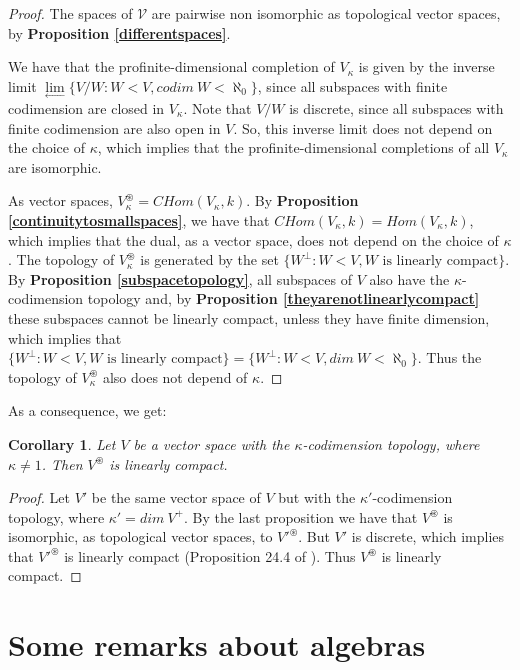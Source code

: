 \documentclass[a4paper,12pt]{article}
\newtheorem{cor}[prop]{Corollary}
\theoremstyle{bloco}
\begin{document}
\begin{proof}The spaces of $\mathcal{V}$ are pairwise non isomorphic as topological vector spaces, by \textbf{Proposition \ref{differentspaces}}. 

We have that the profinite-dimensional completion of $V_{\kappa}$ is given by the inverse limit $\lim\limits_{\longleftarrow}\{V/W: W < V, codim \ W < \aleph_{0} \}$, since all subspaces with finite codimension are closed in $V_{\kappa}$. Note that $V/W$ is discrete, since all subspaces with finite codimension are also open in $V$. So, this inverse limit does not depend on the choice of $\kappa$, which implies that the profinite-dimensional completions of all $V_{\kappa}$ are isomorphic. 

As vector spaces, $V_{\kappa}^{\circledast} = CHom(V_{\kappa},k)$. By \textbf{Proposition \ref{continuitytosmallspaces}}, we have that $CHom(V_{\kappa},k) = Hom(V_{\kappa},k)$, which implies that the dual, as a vector space, does not depend on the choice of $\kappa$. The topology of $V_{\kappa}^{\circledast}$ is generated by the set $\{W^{\perp}: W < V, W \text{ is linearly compact}\}$. By \textbf{Proposition \ref{subspacetopology}}, all subspaces of $V$ also have the $\kappa$-codimension topology and, by \textbf{Proposition \ref{theyarenotlinearlycompact}} these subspaces cannot be linearly compact, unless they have finite dimension, which implies that $\{W^{\perp}: W < V, W \text{ is linearly compact}\} = \{W^{\perp}: W < V, dim \ W < \aleph_{0}\}$. Thus the topology of $V_{\kappa}^{\circledast}$ also does not depend of $\kappa$.
\end{proof}

As a consequence, we get:

\begin{cor}Let $V$ be a vector space with the $\kappa$-codimension topology, where $\kappa \neq 1$. Then $V^{\circledast}$ is linearly compact.
\end{cor}

\begin{proof}Let $V'$ be the same vector space of $V$ but with the $\kappa'$-codimension topology, where $\kappa' = dim \ V^{+}$. By the last proposition we have that $V^{\circledast}$ is isomorphic, as topological vector spaces, to $V'^{\circledast}$. But $V'$ is discrete, which implies that $V'^{\circledast}$ is linearly compact (Proposition 24.4 of \cite{BeH}). Thus $V^{\circledast}$ is linearly compact.
\end{proof}

\section{Some remarks about algebras}
\end{document}
